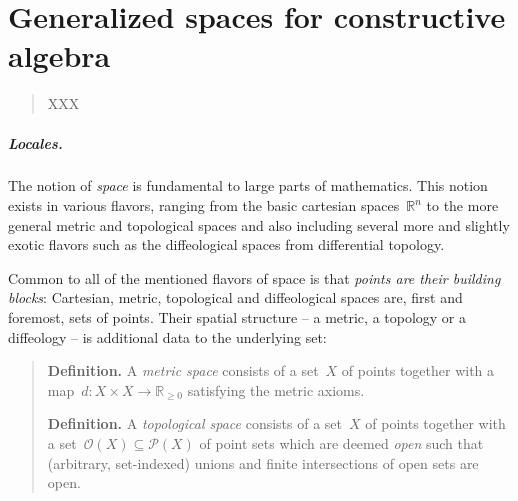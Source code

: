\documentclass{ws-rv9x6}
\renewcommand{\O}{\mathcal{O}}
\newcommand{\RR}{\mathbb{R}}
\renewcommand{\P}{\mathcal{P}}
\renewcommand{\_}{\mathpunct{.}}
\newcommand{\?}{\,{:}\,}
\begin{document}
\chapter{Generalized spaces for constructive algebra}

\author[I. Blechschmidt]{Ingo Blechschmidt}

\address{Università di Verona \\
Department of Computer Science \\
Strada le Grazie 15 \\
37134 Verona, Italy}

\begin{abstract}
XXX
\end{abstract}
\body

\tableofcontents

\paragraph{Locales.}

The notion of \emph{space} is fundamental to large parts of mathematics. This notion
exists in various flavors, ranging from the basic cartesian spaces~$\RR^n$ to
the more general metric and topological spaces and also including several more
and slightly exotic flavors such as the diffeological spaces from differential topology.

Common to all of the mentioned flavors of space is that \emph{points are their
building blocks}: Cartesian, metric, topological and diffeological spaces are,
first and foremost, sets of points. Their spatial structure -- a metric, a
topology or a diffeology -- is additional data to the underlying set:

\begin{quote}
\textbf{Definition.} A \emph{metric space} consists of a set~$X$ of points
together with a map~$d : X \times X \to \RR_{\geq 0}$ satisfying the metric
axioms.

\textbf{Definition.} A \emph{topological space} consists of a set~$X$ of points
together with a set~$\O(X) \subseteq \P(X)$ of point sets which are deemed
\emph{open} such that (arbitrary, set-indexed) unions and finite intersections
of open sets are open.
\end{quote}
\end{document}
